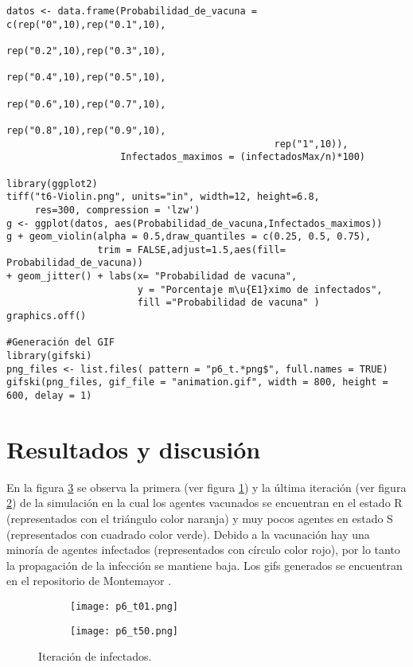 \documentclass[12pt]{amsart}
\begin{document}
\renewcommand{\listingscaption}{Código}
\begin{listing}[H]
  \begin{verbatim}
datos <- data.frame(Probabilidad_de_vacuna = c(rep("0",10),rep("0.1",10),
                                               rep("0.2",10),rep("0.3",10),
                                               rep("0.4",10),rep("0.5",10),
                                               rep("0.6",10),rep("0.7",10),
                                               rep("0.8",10),rep("0.9",10),
                                               rep("1",10)), 
                    Infectados_maximos = (infectadosMax/n)*100)

library(ggplot2)
tiff("t6-Violin.png", units="in", width=12, height=6.8, 
     res=300, compression = 'lzw')
g <- ggplot(datos, aes(Probabilidad_de_vacuna,Infectados_maximos))
g + geom_violin(alpha = 0.5,draw_quantiles = c(0.25, 0.5, 0.75), 
                trim = FALSE,adjust=1.5,aes(fill= Probabilidad_de_vacuna))
+ geom_jitter() + labs(x= "Probabilidad de vacuna",
                       y = "Porcentaje m\u{E1}ximo de infectados", 
                       fill ="Probabilidad de vacuna" )
graphics.off()

#Generación del GIF
library(gifski)
png_files <- list.files( pattern = "p6_t.*png$", full.names = TRUE)
gifski(png_files, gif_file = "animation.gif", width = 800, height = 600, delay = 1)

  \end{verbatim}
  \label{codigo3}
\end{listing}

\clearpage
\section{Resultados y discusión}
En la figura \ref{fig1} se observa la primera (ver figura \ref{1a}) y la última iteración (ver figura \ref{1b}) de la simulación en la cual los agentes vacunados se encuentran en el estado R (representados con el triángulo color naranja) y muy pocos agentes en estado S (representados con cuadrado color verde). Debido a la vacunación hay una minoría de agentes infectados (representados con círculo color rojo), por lo tanto la propagación de la infección se mantiene baja. Los gifs generados se encuentran en el repositorio de Montemayor \cite{mtyor}.
\begin{figure}[h!]
\centering
\begin{subfigure}[H]{0.4\linewidth}
\texttt{[image: p6\_t01.png]}
\caption{}
\label{1a}
\end{subfigure}
\begin{subfigure}[H]{0.4\linewidth}
\texttt{[image: p6\_t50.png]}
\caption{}
\label{1b}
\end{subfigure}
\caption{Iteración de infectados.}
\label{fig1}
\end{figure}
\end{document}
